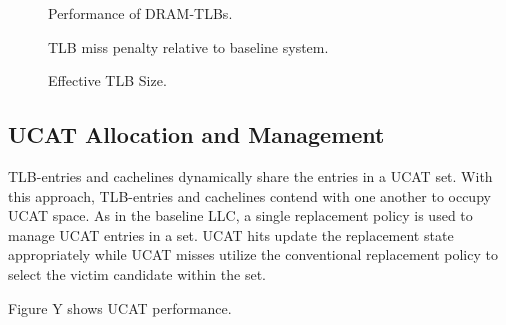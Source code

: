 \begin{figure}[tp] 
  \vspace{-0.in} \centering
  \centerline{}

  \caption{\small Performance of DRAM-TLBs. \normalsize}
  \label{fig:perf_UCAT} 
  \vspace{0.2 in}
\end{figure}

\begin{figure}[tp] 
  \vspace{0.in} \centering
  \centerline{}

  \caption{\small TLB miss penalty relative to baseline system.\normalsize}
  \label{fig:tlblat_UCAT} 
  \vspace{-0.1 in}
\end{figure}

\begin{figure}[tp] 
  \vspace{0.in} \centering
  \centerline{}

  \caption{\small Effective TLB Size.\normalsize}
  \label{fig:tlblat_UCAT} 
  \vspace{-0.1 in}
\end{figure}

\subsection{UCAT Allocation and Management}

TLB-entries and cachelines dynamically share the entries in a UCAT
set. With this approach, TLB-entries and cachelines contend with one
another to occupy UCAT space. As in the baseline LLC, a single
replacement policy is used to manage UCAT entries in a set. UCAT hits
update the replacement state appropriately while UCAT misses utilize
the conventional replacement policy to select the victim candidate
within the set.


Figure Y shows UCAT performance.

